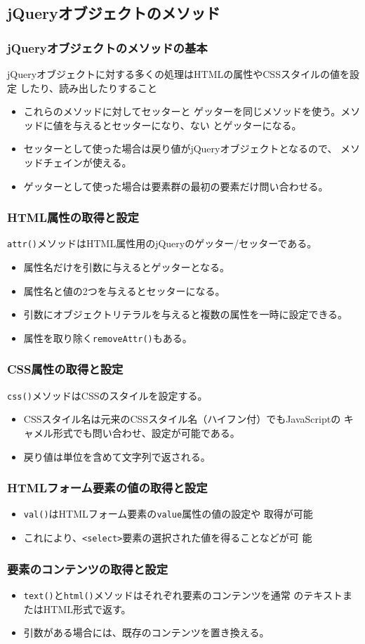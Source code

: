 \subsection{jQueryオブジェクトのメソッド}
\begin{frame}[containsverbatim]
\frametitle{jQueryオブジェクトのメソッドの基本}
jQueryオブジェクトに対する多くの処理はHTMLの属性やCSSスタイルの値を設定
したり、読み出したりすること
\begin{itemize}
 \item これらのメソッドに対してセッターと
ゲッターを同じメソッドを使う。メソッドに値を与えるとセッターになり、ない
とゲッターになる。
 \item セッターとして使った場合は戻り値がjQueryオブジェクトとなるので、
       メソッドチェインが使える。
 \item ゲッターとして使った場合は要素群の最初の要素だけ問い合わせる。
\end{itemize}
\end{frame}
\begin{frame}[containsverbatim]
\frametitle{HTML属性の取得と設定}
\texttt{attr()}メソッドはHTML属性用のjQueryのゲッター/セッターである。
\begin{itemize}
 \item 属性名だけを引数に与えるとゲッターとなる。
 \item 属性名と値の2つを与えるとセッターになる。
 \item 引数にオブジェクトリテラルを与えると複数の属性を一時に設定できる。
 \item 属性を取り除く\texttt{removeAttr()}もある。
\end{itemize}
\end{frame}
\begin{frame}[containsverbatim]
\frametitle{CSS属性の取得と設定}
\texttt{css()}メソッドはCSSのスタイルを設定する。
\begin{itemize}
 \item CSSスタイル名は元来のCSSスタイル名（ハイフン付）でもJavaScriptの
       キャメル形式でも問い合わせ、設定が可能である。
 \item 戻り値は単位を含めて文字列で返される。
\end{itemize}
\end{frame}
\begin{frame}[containsverbatim]
\frametitle{HTMLフォーム要素の値の取得と設定}
\begin{itemize}
 \item \texttt{val()}はHTMLフォーム要素の\texttt{value}属性の値の設定や
       取得が可能
 \item これにより、\texttt{<select>}要素の選択された値を得ることなどが可
       能
\end{itemize}
\end{frame}
\begin{frame}[containsverbatim]
\frametitle{要素のコンテンツの取得と設定}
\begin{itemize}
 \item \texttt{text()}と\texttt{html()}メソッドはそれぞれ要素のコンテンツを通常
のテキストまたはHTML形式で返す。
 \item 引数がある場合には、既存のコンテンツを置き換える。　
\end{itemize}
\end{frame}
